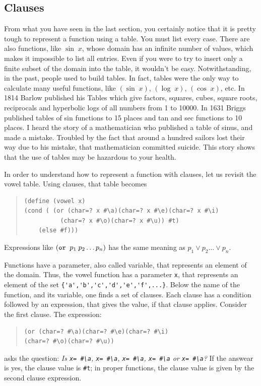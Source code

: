 \documentclass[a4paper,12pt]{book}
\begin{document}
\subsection{Clauses}
From what you have seen in the last section, you certainly notice that it is pretty tough to represent a
function using a table. You must list every case. There are also functions,
like $\sin\;x$, whose domain has an infinite number of values, which makes
it impossible to list all entries. 
Even if you were to try to insert only a finite
subset of the domain into the table, it wouldn't be easy. 
Notwithstanding, in the past,
people used to build tables. In fact, tables were the only way to calculate many
useful functions, like $(\sin\;x)$, 
$(\log\;x)$, $(\cos\;x)$, etc. In 1814 Barlow
published his Tables which give factors, squares, cubes, square roots, reciprocals
and hyperbolic logs of all numbers from 1 to 10000. In 1631 Briggs published
tables of sin functions to 15 places and tan and sec functions to 10 places.
I heard the story of a mathematician who published a table of sinus, and made
a mistake. Troubled by the fact that around a hundred sailors lost their way due to his
mistake, that mathematician committed suicide. This story shows that the use
of tables may be hazardous to your health.

In order to understand how to represent a function with clauses, let us revisit the vowel table.
Using clauses, that table becomes
\begin{quote}\small
\begin{verbatim}
(define (vowel x)
(cond ( (or (char=? x #\a)(char=? x #\e)(char=? x #\i) 
          (char=? x #\o)(char=? x #\u)) #t)
    (else #f)))
\end{verbatim}
\end{quote}
Expressions like $(\verb|or | p_1\;p_2\ldots p_n)$ has the same 
meaning as $p_1 \vee p_2\ldots \vee p_n$.

Functions have a parameter, also called variable, that represents an element of the domain.
Thus, the vowel function has a parameter \verb|x|, that represents an element of the set
\verb|{'a','b','c','d','e','f',...}|.
Below the name of the function, and its variable, one finds a set of clauses.
Each clause has a condition followed by an expression, that gives the value,
if that clause applies. Consider the first clause. The expression:
\begin{quote}
\begin{verbatim}
(or (char=? #\a)(char=? #\e)(char=? #\i)
(char=? #\o)(char=? #\u))
\end{verbatim}
\end{quote}
asks the question: {\em Is \verb|x= #\a|,
\verb|x= #\a|, \verb|x= #\a|, \verb|x= #\a| or
\verb|x= #\a|?} If the answear is yes,
the  clause  value is \verb|#t|; in proper functions,
the clause
value is given by the second clause expression. 
\end{document}
